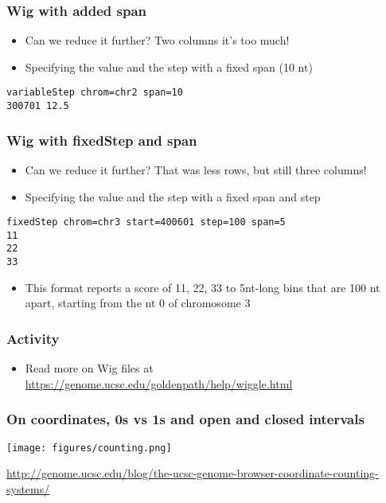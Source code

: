 \documentclass{beamer}
\begin{document}
\begin{frame}[fragile]
  \frametitle{Wig with added span}

  \begin{itemize}
  \item Can we reduce it further? Two columns it's too much! 
  \item Specifying the value and the step with a fixed span (10 nt)
  \end{itemize}

\begin{verbatim}
variableStep chrom=chr2 span=10
300701 12.5
\end{verbatim}
\end{frame}


\begin{frame}[fragile]
  \frametitle{Wig with fixedStep and span}
  \begin{itemize}
  \item Can we reduce it further? That was less rows, but still three columns!
  \item Specifying the value and the step with a fixed span and step
  \end{itemize}

\begin{verbatim}
fixedStep chrom=chr3 start=400601 step=100 span=5
11
22
33 
\end{verbatim}

  \begin{itemize}
  \item This format reports a score of 11, 22, 33 to 5nt-long bins that are 100 nt apart, starting from the nt 0 of chromosome 3
  \end{itemize}
\end{frame}


\begin{frame}
  \frametitle{Activity}
  \begin{itemize}
  \item Read more on Wig files at \url{https://genome.ucsc.edu/goldenpath/help/wiggle.html}
  \end{itemize}
\end{frame}




\begin{frame}
  \frametitle{On coordinates, 0s vs 1s and open and closed intervals}
    \centering   
    \texttt{[image: figures/counting.png]}

 {\tiny \url{http://genome.ucsc.edu/blog/the-ucsc-genome-browser-coordinate-counting-systems/}}
\end{frame}
\end{document}
